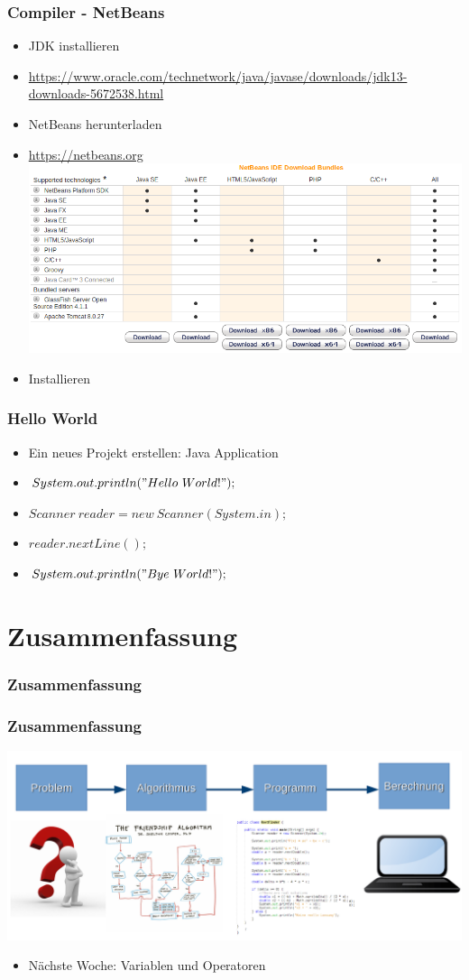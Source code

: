 \documentclass{beamer}
\begin{document}
	\begin{frame}
		\frametitle{Compiler - NetBeans}
		\begin{itemize}
			\item JDK installieren
			\item \url{https://www.oracle.com/technetwork/java/javase/downloads/jdk13-downloads-5672538.html}
			\item NetBeans herunterladen
			\item \url{https://netbeans.org} \\
			\includegraphics[width=.5\textwidth]{Netbeans-Download}
			\item Installieren
		\end{itemize}
	\end{frame}

	\begin{frame}
		\frametitle{Hello World}
		\begin{itemize}
			\item Ein neues Projekt erstellen: Java Application
			\item $System.out.println("Hello\ World!");$
			\pause
			\item $Scanner\ reader = new\ Scanner(System.in);$
			\item $reader.nextLine();$
			\pause
			\item $System.out.println("Bye\ World!");$
		\end{itemize}
	\end{frame}

	\section{Zusammenfassung}
	\begin{frame}
		\frametitle{Zusammenfassung}
	\end{frame}

	\begin{frame}
		\frametitle{Zusammenfassung}
		\includegraphics[width=\textwidth]{Alg-Prog-Schema}
		\begin{itemize}
			\item Nächste Woche: Variablen und Operatoren
		\end{itemize}
	\end{frame}
\end{document}
